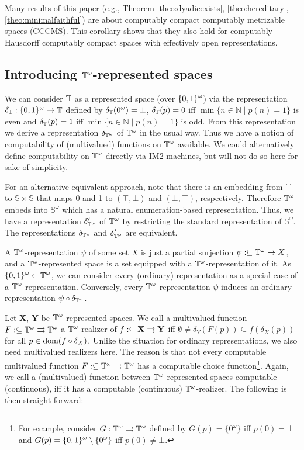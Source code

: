 \documentclass{eptcs-modified}
\begin{document}
Many results of this paper
(e.g., Theorem \ref{theo:dyadicexists}, \ref{theo:hereditary}, \ref{theo:minimalfaithful}) are about computably compact computably metrizable spaces (CCCMS). This corollary shows that they also hold for computably Hausdorff computably compact spaces with effectively open representations.


\subsection{Introducing $\mathbb{T}^\omega$-represented spaces}
\label{section-introtomega}
We can consider $\mathbb{T}$ as a represented space (over ${\{0,1\}^\omega}$) via the representation $\delta_{\mathbb{T}} : {\{0,1\}^\omega} \to \mathbb{T}$ defined by $\delta_{\mathbb{T}}(0^\omega) = \bot$, $\delta_{\mathbb{T}}(p) = 0$ iff $\min \{n \in \mathbb{N} \mid p(n) = 1\}$ is even and $\delta_{\mathbb{T}}(p) = 1$ iff $\min \{n \in \mathbb{N} \mid p(n) = 1\}$ is odd. From this representation we derive a representation $\delta_{\mathbb{T}^\omega}$ of $\mathbb{T}^\omega$ in the usual way.
Thus we have a notion of computability of (multivalued) functions on $\mathbb{T}^\omega$ available. We could alternatively define computability on $\mathbb{T}^\omega$ directly via IM2 machines, but will not do so here for sake of simplicity.

For an alternative equivalent approach, note that there is an embedding from $\mathbb{T}$ to $\mathbb{S} \times \mathbb{S}$ that maps
  0 and 1 to $(\top, \bot)$ and  $(\bot, \top)$, respectively. Therefore
  $\mathbb{T}^\omega$ embeds into $\mathbb{S}^\omega$ which has a natural enumeration-based representation.  Thus, we have a representation $\delta_{\mathbb{T}^\omega}'$ of
$\mathbb{T}^\omega$ by restricting the standard representation of $\mathbb{S}^\omega$. The representations $\delta_{\mathbb{T}^\omega}$ and $\delta_{\mathbb{T}^\omega}'$ are equivalent.

A $\mathbb{T}^\omega$-representation $\psi$ of some set $X$ is just a partial surjection $\psi : \subseteq \mathbb{T}^\omega \to X$, and a $\mathbb{T}^\omega$-represented space is a set equipped with a $\mathbb{T}^\omega$-representation of it. As ${\{0,1\}^\omega} \subset \mathbb{T}^\omega$, we can consider every (ordinary) representation as a special case of a $\mathbb{T}^\omega$-representation. Conversely, every $\mathbb{T}^\omega$-representation $\psi$ induces an ordinary representation $\psi \circ \delta_{\mathbb{T}^\omega}$.

Let $\mathbf{X}$, $\mathbf{Y}$ be $\mathbb{T}^\omega$-represented spaces. We call a multivalued function $F : \subseteq \mathbb{T}^\omega \rightrightarrows \mathbb{T}^\omega$ a $\mathbb{T}^\omega$-realizer of $f : \subseteq \mathbf{X} \rightrightarrows \mathbf{Y}$ iff $\emptyset \neq \delta_Y(F(p)) \subseteq f(\delta_X(p))$ for all $p \in \operatorname{dom}(f \circ \delta_X)$. Unlike the situation for ordinary representations, we also need multivalued realizers here. The reason is that not every computable multivalued function $F : \subseteq \mathbb{T}^\omega \rightrightarrows \mathbb{T}^\omega$ has a computable choice function\footnote{For example, consider $G : \mathbb{T}^\omega \rightrightarrows \mathbb{T}^\omega$ defined by $G(p) = \{0^\omega\}$ iff $p(0) = \bot$ and $G(p) = {\{0,1\}^\omega} \setminus \{0^\omega\}$ iff $p(0) \neq \bot$.}. Again, we call a (multivalued) function between $\mathbb{T}^\omega$-represented spaces computable (continuous), iff it has a computable (continuous) $\mathbb{T}^\omega$-realizer. The following is then straight-forward:
\end{document}
